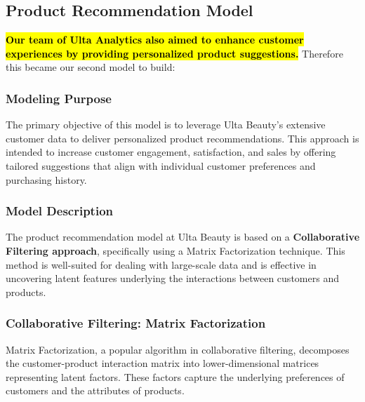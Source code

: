 \documentclass{article}
\begin{document}
\subsection{Product Recommendation Model}
\label{sec:product_recommendation_model}

\textbf{\hl{Our team of Ulta Analytics also aimed to enhance customer experiences by providing personalized product suggestions.}} Therefore this became our second model to build:

\subsubsection{Modeling Purpose}
\label{sec:modeling_purpose}
The primary objective of this model is to leverage Ulta Beauty's extensive customer data to deliver personalized product recommendations. This approach is intended to increase customer engagement, satisfaction, and sales by offering tailored suggestions that align with individual customer preferences and purchasing history.

\subsubsection{Model Description}
\label{sec:model_description}
The product recommendation model at Ulta Beauty is based on a \textbf{Collaborative Filtering approach}, specifically using a Matrix Factorization technique. This method is well-suited for dealing with large-scale data and is effective in uncovering latent features underlying the interactions between customers and products.

\subsubsection{Collaborative Filtering: Matrix Factorization}
Matrix Factorization, a popular algorithm in collaborative filtering, decomposes the customer-product interaction matrix into lower-dimensional matrices representing latent factors. These factors capture the underlying preferences of customers and the attributes of products.
\end{document}
